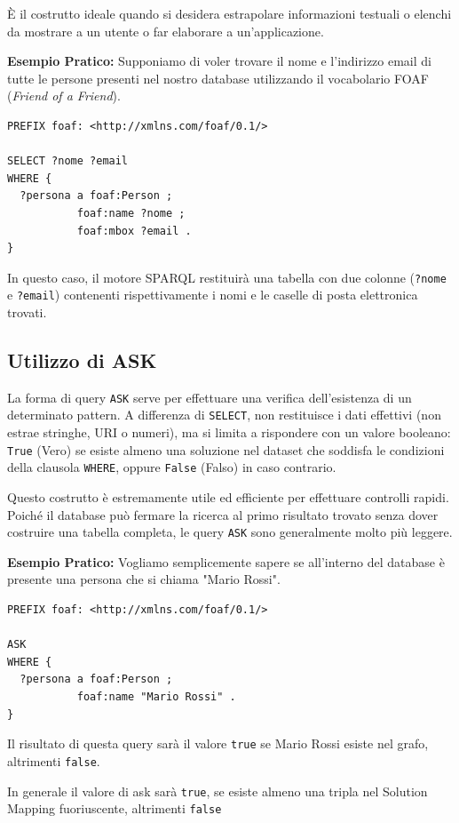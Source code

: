 È il costrutto ideale quando si desidera estrapolare informazioni testuali o elenchi da mostrare a un utente o far elaborare a un'applicazione.

\textbf{Esempio Pratico:}
Supponiamo di voler trovare il nome e l'indirizzo email di tutte le persone presenti nel nostro database utilizzando il vocabolario FOAF (\textit{Friend of a Friend}).

\begin{lstlisting}
PREFIX foaf: <http://xmlns.com/foaf/0.1/>

SELECT ?nome ?email
WHERE {
  ?persona a foaf:Person ;
           foaf:name ?nome ;
           foaf:mbox ?email .
}
\end{lstlisting}
In questo caso, il motore SPARQL restituirà una tabella con due colonne (\texttt{?nome} e \texttt{?email}) contenenti rispettivamente i nomi e le caselle di posta elettronica trovati.

\subsection{Utilizzo di ASK}
La forma di query \texttt{ASK} serve per effettuare una verifica dell'esistenza di un determinato pattern. A differenza di \texttt{SELECT}, non restituisce i dati effettivi (non estrae stringhe, URI o numeri), ma si limita a rispondere con un valore booleano: \texttt{True} (Vero) se esiste almeno una soluzione nel dataset che soddisfa le condizioni della clausola \texttt{WHERE}, oppure \texttt{False} (Falso) in caso contrario.

Questo costrutto è estremamente utile ed efficiente per effettuare controlli rapidi. Poiché il database può fermare la ricerca al primo risultato trovato senza dover costruire una tabella completa, le query \texttt{ASK} sono generalmente molto più leggere.

\textbf{Esempio Pratico:}
Vogliamo semplicemente sapere se all'interno del database è presente una persona che si chiama "Mario Rossi".

\begin{lstlisting}
PREFIX foaf: <http://xmlns.com/foaf/0.1/>

ASK
WHERE {
  ?persona a foaf:Person ;
           foaf:name "Mario Rossi" .
}
\end{lstlisting}
Il risultato di questa query sarà il valore \texttt{true} se Mario Rossi esiste nel grafo, altrimenti \texttt{false}.

In generale il valore di ask sarà \texttt{true}, se esiste almeno una tripla nel Solution Mapping fuoriuscente, altrimenti \texttt{false}

